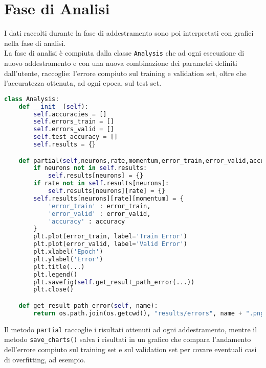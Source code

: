 \section{Fase di Analisi}
I dati raccolti durante la fase di addestramento sono poi interpretati con grafici nella fase di analisi. \\
La fase di analisi è compiuta dalla classe \texttt{Analysis} che ad ogni esecuzione di nuovo addestramento e con una nuova combinazione dei parametri definiti dall'utente, raccoglie: l'errore compiuto sul training e validation set, oltre che l'accuratezza ottenuta, ad ogni epoca, sul test set. \\
\begin{lstlisting}[language=Python]
class Analysis:
    def __init__(self):
        self.accuracies = []
        self.errors_train = []
        self.errors_valid = []
        self.test_accuracy = []
        self.results = {}

    def partial(self,neurons,rate,momentum,error_train,error_valid,accuracy):
        if neurons not in self.results:
            self.results[neurons] = {}
        if rate not in self.results[neurons]:
            self.results[neurons][rate] = {}
        self.results[neurons][rate][momentum] = {
            'error_train' : error_train,
            'error_valid' : error_valid,
            'accuracy' : accuracy
        }
        plt.plot(error_train, label='Train Error')
        plt.plot(error_valid, label='Valid Error')
        plt.xlabel('Epoch')
        plt.ylabel('Error')
        plt.title(...)
        plt.legend()
        plt.savefig(self.get_result_path_error(...))
        plt.close()

    def get_result_path_error(self, name):
        return os.path.join(os.getcwd(), "results/errors", name + ".png")
\end{lstlisting}
Il metodo \texttt{partial} raccoglie i risultati ottenuti ad ogni addestramento, mentre il metodo \texttt{save\_charts()} salva i risultati in un grafico che compara l'andamento dell'errore compiuto sul training set e sul validation set per covare eventuali casi di overfitting, ad esempio.